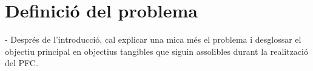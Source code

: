 \chapter{Definició del problema}

        - Després de l'introducció, cal explicar una mica
        més el problema i desglossar el objectiu principal
        en objectius tangibles que siguin assolibles
        durant la realització del PFC.
